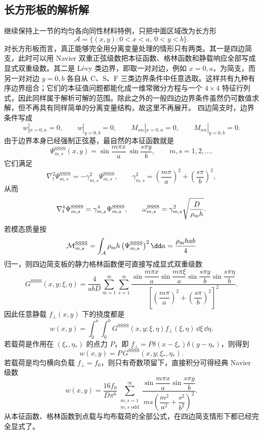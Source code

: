 \subsection{长方形板的解析解}
\label{sec:phys-sm-rectangular}
继续保持上一节的均匀各向同性材料特例，只把中面区域改为长方形
\[
 \mathcal A=\{(x,y):0<x<a,\ 0<y<b\}.
\]
对长方形板而言，真正能够完全用分离变量处理的情形只有两类。其一是四边简支，此时可以用 Navier 双重正弦级数把本征函数、格林函数和静载响应全部写成显式双重级数。其二是 L\'evy 类边界，即取一对对边，例如 \(x=0,a\)，为简支，而另一对对边 \(y=0,b\) 各自从 \(\mathrm C\)、\(\mathrm S\)、\(\mathrm F\) 三类边界条件中任意选取。这样共有九种有序边界组合；它们的本征值问题都能化成一维常微分方程与一个 \(4\times4\) 特征行列式，因此同样属于解析可解的范围。除此之外的一般四边边界条件虽然仍可数值求解，但不再具有同样简单的分离变量结构，故这里不再展开。
四边简支时，边界条件写成
\[
 w|_{x=0,a}=0,
 \qquad
 w|_{y=0,b}=0,
 \qquad
 M_{nn}|_{x=0,a}=0,
 \qquad
 M_{nn}|_{y=0,b}=0.
\]
由于边界本身已经强制正弦基，最自然的本征函数就是
\[
 \Psi_{m,s}^{\mathrm{SSSS}}(x,y)=\sin\frac{m\pi x}{a}\,\sin\frac{s\pi y}{b},
 \qquad m,s=1,2,\dots.
\]
它们满足
\[
 \nabla_t^2\Psi_{m,s}^{\mathrm{SSSS}}=-\gamma_{m,s}^2\Psi_{m,s}^{\mathrm{SSSS}},
 \qquad
 \gamma_{m,s}^2=\left(\frac{m\pi}{a}\right)^2+\left(\frac{s\pi}{b}\right)^2,
\]
从而
\[
 \nabla_t^4\Psi_{m,s}^{\mathrm{SSSS}}=\gamma_{m,s}^4\Psi_{m,s}^{\mathrm{SSSS}},
 \qquad
 \omega_{m,s}^{\mathrm{SSSS}}=\gamma_{m,s}^2\sqrt{\frac{D}{\rho_{\rm m} h}}.
\]
若模态质量按
\[
 \mathcal M_{m,s}^{\mathrm{SSSS}}=\int_{\mathcal A}\rho_{\rm m} h\,\bigl(\Psi_{m,s}^{\mathrm{SSSS}}\bigr)^2\,\dd a=\frac{\rho_{\rm m} hab}{4}
\]
归一，则四边简支板的静力格林函数便可直接写成显式双重级数
\[
 G^{\mathrm{SSSS}}(x,y;\xi,\eta)=\frac{4}{abD}\sum_{m=1}^{\infty}\sum_{s=1}^{\infty}
 \frac{\sin\dfrac{m\pi x}{a}\sin\dfrac{m\pi \xi}{a}\sin\dfrac{s\pi y}{b}\sin\dfrac{s\pi \eta}{b}}{\left[\left(\dfrac{m\pi}{a}\right)^2+\left(\dfrac{s\pi}{b}\right)^2\right]^2}.
\]
因此任意静载 \(f_\perp(x,y)\) 下的挠度都是
\[
 w(x,y)=\int_0^a\int_0^b G^{\mathrm{SSSS}}(x,y;\xi,\eta)f_\perp(\xi,\eta)\,\dd \xi\,\dd \eta.
\]
若载荷是作用在 \((\xi_*,\eta_*)\) 的点力 \(P\)，即 \(f_\perp=P\delta(x-\xi_*)\delta(y-\eta_*)\)，则得到
\[
 w(x,y)=P\,G^{\mathrm{SSSS}}(x,y;\xi_*,\eta_*).
\]
若载荷是均匀横向负载 \(f_\perp=f_0\)，则只有奇数项留下，直接积分可得经典 Navier 级数
\[
 w(x,y)=\frac{16f_0}{D\pi^6}\sum_{\substack{m,s=1\\ m,s\text{ odd}}}^{\infty}
 \frac{\sin\dfrac{m\pi x}{a}\sin\dfrac{s\pi y}{b}}{ms\left(\dfrac{m^2}{a^2}+\dfrac{s^2}{b^2}\right)^2}.
\]
从本征函数、格林函数到点载与均布载荷的全部公式，在四边简支情形下都已经完全显式了。
